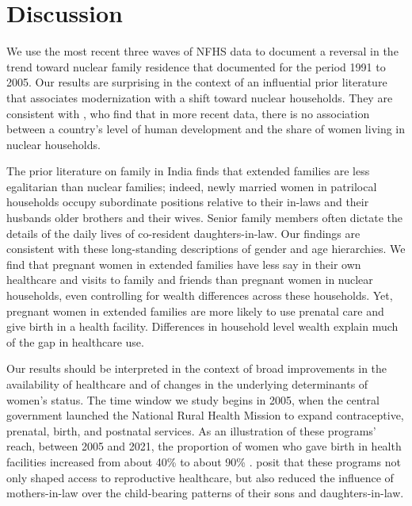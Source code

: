 \documentclass[10pt,twoside,reqno]{article}
\begin{document}
\section{Discussion}

We use the most recent three waves of NFHS data to document a reversal in the trend toward nuclear family residence that \cite{allendorf2013going} documented for the period 1991 to 2005.  Our results are surprising in the context of an influential prior literature that associates modernization with a shift toward nuclear households.  They are consistent with \cite{pesando2018global}, who find that in more recent data, there is no association between a country's level of human development and the share of women living in nuclear households.

The prior literature on family in India finds that extended families are less egalitarian than nuclear families; indeed, newly married women in patrilocal households occupy subordinate positions relative to their in-laws and their husbands older brothers and their wives. Senior family members often dictate the details of the daily lives of co-resident daughters-in-law. Our findings are consistent with these long-standing descriptions of gender and age hierarchies.  We find that pregnant women in extended families have less say in their own healthcare and visits to family and friends than pregnant women in nuclear households, even controlling for wealth differences across these households. Yet, pregnant women in extended families are more likely to use prenatal care and give birth in a health facility.  Differences in household level wealth explain much of the gap in healthcare use. 

Our results should be interpreted in the context of broad improvements in the availability of healthcare and of changes in the underlying determinants of women's status.  The time window we study begins in 2005, when the central government launched the National Rural Health Mission to expand contraceptive, prenatal, birth, and postnatal services.  As an illustration of these programs' reach, between 2005 and 2021, the proportion of women who gave birth in health facilities increased from about 40\% to about 90\% \citep{IIPS2007NFHS3,IIPS2021NFHS5}.  \cite{char2010influence} posit that these programs not only shaped access to reproductive healthcare, but also reduced the influence of mothers-in-law over the child-bearing patterns of their sons and daughters-in-law.  
\end{document}
